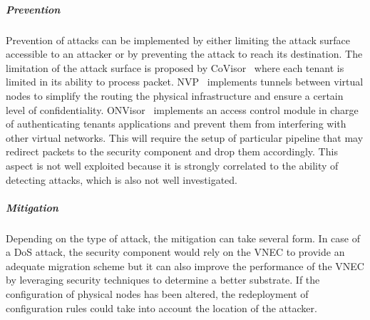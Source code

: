\subparagraph{Prevention}
Prevention of attacks can be implemented by either limiting the attack surface accessible to an attacker or by preventing the attack to reach its destination. The limitation of the attack surface is proposed by CoVisor~\cite{CoVisor-Jin2015} where each tenant is limited in its ability to process packet.
NVP~\cite{NVP-Koponen2014} implements tunnels between virtual nodes to simplify the routing the physical infrastructure and ensure a certain level of confidentiality.
ONVisor~\cite{ONVisor-Han2018} implements an access control module in charge of authenticating tenants applications and prevent them from interfering with other virtual networks.
This will require the setup of particular pipeline that may redirect packets to the security component and drop them accordingly. This aspect is not well exploited because it is strongly correlated to the ability of detecting attacks, which is also not well investigated. 

\subparagraph{Mitigation}
Depending on the type of attack, the mitigation can take several form. 
In case of a DoS attack, the security component would rely on the VNEC to provide an adequate migration scheme but it can also improve the performance of the VNEC by leveraging security techniques to determine a better substrate. 
If the configuration of physical nodes has been altered, the redeployment of configuration rules could take into account the location of the attacker.


